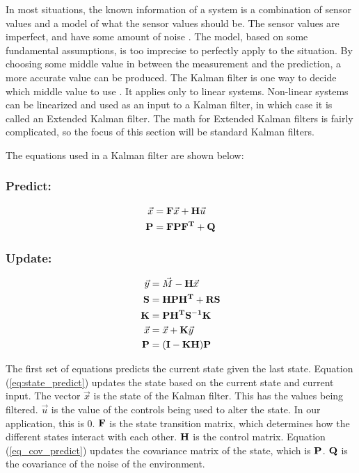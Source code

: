 In most situations, the known information of a system is a combination of sensor values and a model of what the sensor values should be. The sensor values are imperfect, and have some amount of noise \cite{kf_pictures}. The model, based on some fundamental assumptions, is too imprecise to perfectly apply to the situation. By choosing some middle value in between the measurement and the prediction, a more accurate value can be produced. The Kalman filter is one way to decide which middle value to use \cite{kf_robots}. It applies only to linear systems. Non-linear systems can be linearized and used as an input to a Kalman filter, in which case it is called an Extended Kalman filter. The math for Extended Kalman filters is fairly complicated, so the focus of this section will be standard Kalman filters.\par
The equations used in a Kalman filter are shown below:
\subsubsection*{Predict:}
\begin{align}
    \vec{x} &= \mathbf{F}\vec{x} + \mathbf{H}\vec{u}\label{eq:state_predict} \\ 
    \mathbf{P} &= \mathbf{F}\mathbf{P}\mathbf{F^T} + \mathbf{Q} \label{eq:cov_predict}
\end{align}
\subsubsection*{Update:}
\begin{align}
    \vec{y} &= \vec{M} - \mathbf{H}\vec{x} \\
    \mathbf{S}&= \mathbf{HPH^T+RS} \\
    \mathbf{K} &= \mathbf{PH^TS^{-1}K} \\
    \vec{x} &= \vec{x} + \mathbf{K}\vec{y} \\
    \mathbf{P} &= \mathbf{(I-KH)P}
\end{align} \par

The first set of equations predicts the current state given the last state. Equation (\ref{eq:state_predict}) updates the state based on the current state and current input. The vector $\vec{x}$ is the state of the Kalman filter. This has the values being filtered. $\vec{u}$ is the value of the controls being used to alter the state. In our application, this is 0. $\mathbf{F}$ is the state transition matrix, which determines how the different states interact with each other.  $\mathbf{H}$ is the control matrix. Equation (\ref{eq_cov_predict}) updates the covariance matrix of the state, which is $\mathbf{P}$. $\mathbf{Q}$ is the covariance of the noise of the environment. \par

